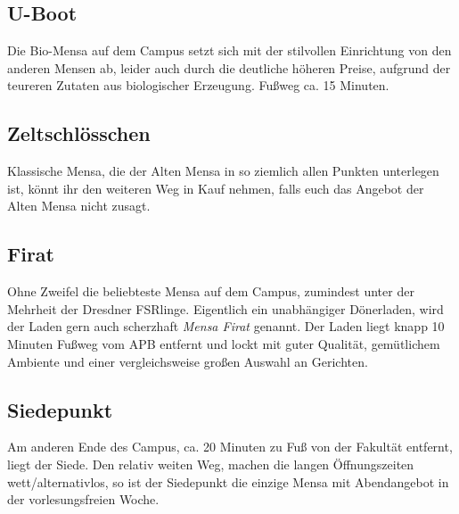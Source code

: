 \subsection*{U-Boot}
Die Bio-Mensa auf dem Campus setzt sich mit der stilvollen Einrichtung von den anderen Mensen ab, leider auch durch die deutliche höheren Preise, aufgrund der teureren Zutaten aus biologischer Erzeugung.
Fußweg ca. 15 Minuten.

\subsection*{Zeltschlösschen}
Klassische Mensa, die der Alten Mensa in so ziemlich allen Punkten unterlegen ist, könnt ihr den weiteren Weg in Kauf nehmen, falls euch das Angebot der Alten Mensa nicht zusagt.

\subsection*{Firat}
Ohne Zweifel die beliebteste Mensa auf dem Campus, zumindest unter der Mehrheit der Dresdner FSRlinge.
Eigentlich ein unabhängiger Dönerladen, wird der Laden gern auch scherzhaft \emph{Mensa Firat} genannt.
Der Laden liegt knapp 10 Minuten Fußweg vom APB entfernt und lockt mit guter Qualität, gemütlichem Ambiente und einer vergleichsweise großen Auswahl an Gerichten.

\subsection*{Siedepunkt}
Am anderen Ende des Campus, ca. 20 Minuten zu Fuß von der Fakultät entfernt, liegt der Siede.
Den relativ weiten Weg, machen die langen Öffnungszeiten wett/alternativlos, so ist der Siedepunkt die einzige Mensa mit Abendangebot in der vorlesungsfreien Woche.
